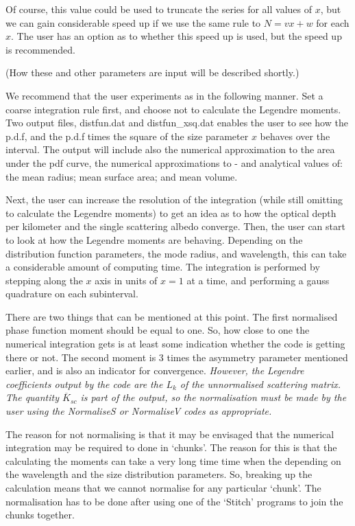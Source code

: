 \begin{flushleft}
 Of course, this value could be used to truncate the series
for all values of $x$, but we can gain considerable speed up if we use the same
rule to $N=v x+w$ for each $x$. The user has an option as to whether this speed up
is used, but the speed up is recommended.

(How these and other parameters are input will be described shortly.)

We recommend that the user experiments as in the following manner. 
Set a coarse
integration rule first, and choose not to calculate the Legendre moments.
Two output files, distfun.dat and  distfun\_xsq.dat  enables the user to see how
the p.d.f, and the p.d.f times the square of the size parameter $x$ behaves over the
interval.
The output
will include also the numerical approximation to the
 area under the pdf curve, the numerical approximations to -  and
analytical values of: the mean radius; mean surface area; and mean volume.

Next, the user can increase the
resolution of the integration (while still omitting to calculate the Legendre
moments) to get an idea as to how the optical depth per kilometer and the single 
scattering albedo converge. Then, the user can start to look at how the
Legendre moments are behaving. Depending on the distribution function parameters,
the  mode radius, and wavelength, this can take a considerable amount of
 computing time. The integration is performed by stepping along the $x$ axis
in units of $x=1$ at a time, and performing a gauss quadrature on each subinterval.  

There are two things that can be mentioned at this point. The first normalised
phase function moment should
be equal to one. So, how close to one the numerical integration gets is at least some
indication whether the code is getting there or not. The second moment is
3 times the asymmetry parameter mentioned earlier, and is also an indicator for
convergence. {\it However, the Legendre coefficients output by the code are the $L_k$
of the unnormalised scattering matrix. The quantity ${\overline K_{sc}}$ is part of the 
output, so the normalisation must be made by the user using the NormaliseS or NormaliseV
codes as appropriate.}

The reason for not normalising is that it may be envisaged that the numerical integration
may be required to done in `chunks'. The reason for this is that the calculating the moments
can take a very long time time when the depending on the wavelength and the size
distribution parameters. So, breaking up the calculation means that we cannot
normalise for any particular `chunk'. The normalisation has to be done after using
 one of the `Stitch' programs to join the chunks together.


\end{flushleft}
